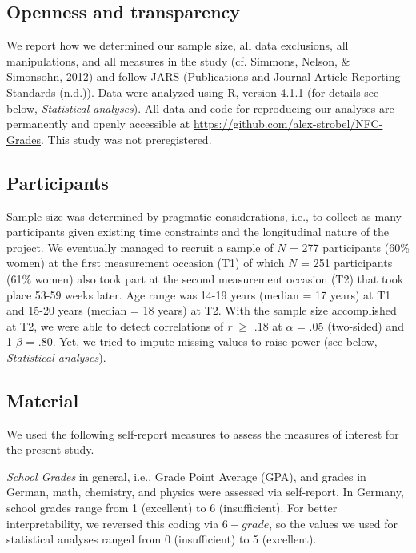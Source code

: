 \documentclass[
  man]{apa6}
\begin{document}
\hypertarget{openness-and-transparency}{%
\subsection{Openness and transparency}\label{openness-and-transparency}}

We report how we determined our sample size, all data exclusions, all manipulations, and all measures in the study (cf. Simmons, Nelson, \& Simonsohn, 2012) and follow JARS (Publications and Journal Article Reporting Standards (n.d.)).
Data were analyzed using R, version 4.1.1 (for details see below, \emph{Statistical analyses}).
All data and code for reproducing our analyses are permanently and openly accessible at \url{https://github.com/alex-strobel/NFC-Grades}.
This study was not preregistered.

\hypertarget{participants}{%
\subsection{Participants}\label{participants}}

Sample size was determined by pragmatic considerations, i.e., to collect as many participants given existing time constraints and the longitudinal nature of the project.
We eventually managed to recruit a sample of \(N\) = 277 participants (60\% women) at the first measurement occasion (T1) of which \(N\) = 251 participants (61\% women) also took part at the second measurement occasion (T2) that took place 53-59 weeks later.
Age range was 14-19 years (median = 17 years) at T1 and 15-20 years (median = 18 years) at T2.
With the sample size accomplished at T2, we were able to detect correlations of \emph{r} \(\ge\) .18 at \(\alpha\) = .05 (two-sided) and 1-\(\beta\) = .80.
Yet, we tried to impute missing values to raise power (see below, \emph{Statistical analyses}).

\hypertarget{material}{%
\subsection{Material}\label{material}}

We used the following self-report measures to assess the measures of interest for the present study.

\emph{School Grades} in general, i.e., Grade Point Average (GPA), and grades in German, math, chemistry, and physics were assessed via self-report. In Germany, school grades range from 1 (excellent) to 6 (insufficient). For better interpretability, we reversed this coding via \(6 - grade\), so the values we used for statistical analyses ranged from 0 (insufficient) to 5 (excellent).
\end{document}
